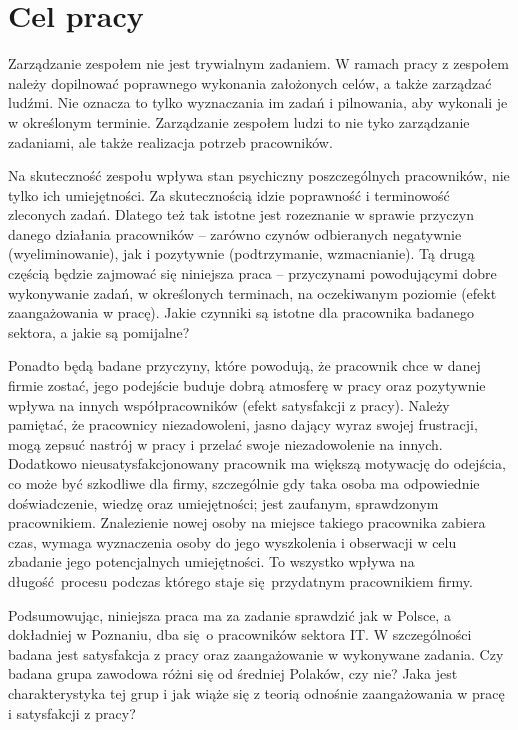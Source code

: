 \chapter{Cel pracy}
Zarządzanie zespołem nie jest trywialnym zadaniem. W ramach pracy z zespołem należy dopilnować poprawnego wykonania założonych celów, a także zarządzać ludźmi. Nie oznacza to tylko wyznaczania im zadań i pilnowania, aby wykonali je w określonym terminie. Zarządzanie zespołem ludzi to nie tyko zarządzanie zadaniami, ale także realizacja potrzeb pracowników.

Na skuteczność zespołu wpływa stan psychiczny poszczególnych pracowników, nie tylko ich umiejętności. Za skutecznością idzie poprawność i terminowość zleconych zadań. Dlatego też tak istotne jest rozeznanie w sprawie przyczyn danego działania pracowników -- zarówno czynów odbieranych negatywnie (wyeliminowanie), jak i pozytywnie (podtrzymanie, wzmacnianie). Tą drugą częścią będzie zajmować się niniejsza praca -- przyczynami powodującymi dobre wykonywanie zadań, w określonych terminach, na
oczekiwanym poziomie (efekt zaangażowania w pracę). Jakie czynniki są istotne dla pracownika badanego sektora, a jakie są pomijalne? 

Ponadto będą badane przyczyny, które powodują, że pracownik chce w danej firmie zostać, jego podejście buduje dobrą atmosferę w pracy oraz pozytywnie wpływa na innych współpracowników (efekt satysfakcji z pracy). Należy pamiętać, że pracownicy niezadowoleni, jasno dający wyraz swojej frustracji, mogą zepsuć nastrój w pracy i przelać swoje niezadowolenie na innych. Dodatkowo nieusatysfakcjonowany pracownik ma większą motywację do odejścia, co może być szkodliwe dla firmy, szczególnie gdy taka osoba ma odpowiednie doświadczenie, wiedzę oraz umiejętności; jest zaufanym, sprawdzonym pracownikiem. Znalezienie nowej osoby na miejsce takiego pracownika zabiera czas, wymaga
wyznaczenia osoby do jego wyszkolenia i obserwacji w celu zbadanie jego
potencjalnych umiejętności. To wszystko wpływa na długość procesu podczas którego staje się przydatnym pracownikiem firmy.

Podsumowując, niniejsza praca ma za zadanie sprawdzić jak w Polsce, a dokładniej w Poznaniu, dba się o pracowników sektora IT. W szczególności badana jest satysfakcja z pracy oraz zaangażowanie w wykonywane zadania. Czy badana grupa zawodowa różni się od średniej Polaków, czy nie? Jaka jest charakterystyka tej grup i jak wiąże się z teorią odnośnie zaangażowania w pracę i satysfakcji z pracy?
